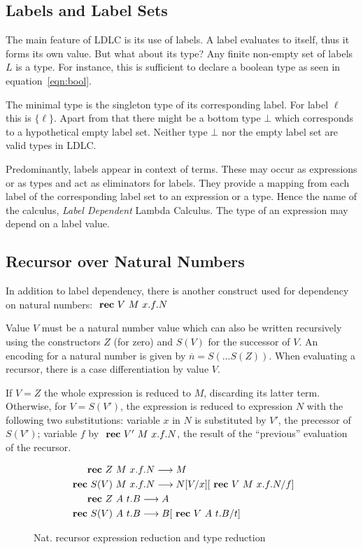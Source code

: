 \subsection{Labels and Label Sets}

The main feature of LDLC is its use of labels. A label evaluates to itself, thus it forms its own value. But what about its type? Any finite non-empty set of labels $L$ is a type. For instance, this is sufficient to declare a boolean type as seen in equation~\ref{eqn:bool}.

The minimal type is the singleton type of its corresponding label. For label $\ell$ this is $\{\ell\}$. Apart from that there might be a bottom type $\bot$ which corresponds to a hypothetical empty label set. Neither type $\bot$ nor the empty label set are valid types in LDLC.

Predominantly, labels appear in context of \case terms. These may occur as expressions or as types and act as eliminators for labels. They provide a mapping from each label of the corresponding label set to an expression or a type. Hence the name of the calculus, \emph{Label Dependent} Lambda Calculus. The type of an expression may depend on a label value.

\subsection{Recursor over Natural Numbers}

In addition to label dependency, there is another construct used for dependency on natural numbers: $\text{ \textbf{rec} } V~M~x.f.N$

Value $V$ must be a natural number value which can also be written recursively using the constructors $Z$ (for zero) and $S(V)$ for the successor of $V$. An encoding for a natural number is given by $\overline{n} = S(\dots S(Z))$. When evaluating a recursor, there is a case differentiation by value $V$.

If $V=Z$ the whole expression is reduced to $M$, discarding its latter term. Otherwise, for $V=S(V')$, the \rec expression is reduced to expression $N$ with the following two substitutions: variable $x$ in $N$ is substituted by $V'$, the precessor of $S(V')$; variable $f$ by $\text{ \textbf{rec} } V'~M~x.f.N$, the result of the ``previous'' evaluation of the recursor.

\begin{figure}
 \begin{align*}
 \text{ \textbf{rec} } Z~&M~x.f.N \longrightarrow M \\
 \text{ \textbf{rec} } S(V)~&M~x.f.N \longrightarrow N [V/x] [\text{ \textbf{rec} } V~M~x.f.N/f] \\
 \text{ \textbf{rec} } Z~&A~t.B \longrightarrow A \\
 \text{ \textbf{rec} } S(V)~&A~t.B \longrightarrow B [\text{ \textbf{rec} } V~A~t.B/t]
\end{align*}
\caption{Nat. recursor expression reduction and type reduction}
\label{fig:ldlc-rec-exp}
\end{figure}


